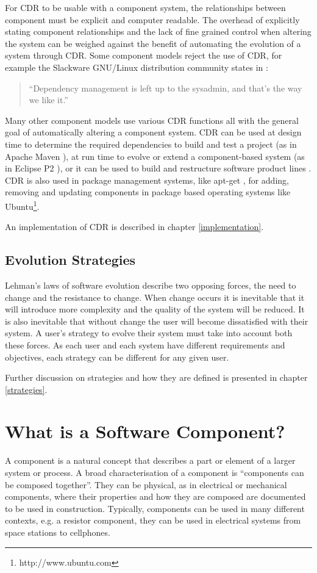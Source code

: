 For CDR to be usable with a component system, the relationships between component must be explicit and computer readable.
The overhead of explicitly stating component relationships and the lack of fine grained control when altering the system
can be weighed against the benefit of automating the evolution of a system through CDR.
Some component models reject the use of CDR, 
for example the Slackware GNU/Linux distribution community states in \citep{Lumens2000}:
\begin{quote}
``Dependency management is left up to the sysadmin, and that's the way we like it.''
\end{quote}
Many other component models use various CDR functions all with the general goal of automatically altering a component system.
CDR can be used at design time to determine the required dependencies to build and test a project (as in Apache Maven \citep{casey_better_2008}),
at run time to evolve or extend a component-based system (as in Eclipse P2 \citep{leBerre2010}),
or it can be used to build and restructure software product lines \citep{savolainen_analyzing_2007}.
CDR is also used in package management systems, like apt-get \citep{Barth2005},
for adding, removing and updating components in package based operating systems like Ubuntu\footnote{http://www.ubuntu.com}. 

An implementation of CDR is described in chapter \ref{implementation}.

\subsection{Evolution Strategies}
Lehman's laws of software evolution \citep{lehman1980,lehman1997} describe two opposing forces,
the need to change and the resistance to change.
When change occurs it is inevitable that it will introduce more complexity and the quality of the system will be reduced.
It is also inevitable that without change the user will become dissatisfied with their system.
A user's strategy to evolve their system must take into account both these forces.
As each user and each system have different requirements and objectives, each strategy can be different for any given user.

Further discussion on strategies and how they are defined is presented in chapter \ref{strategies}.

\section{What is a Software Component?}
\label{background.components}
A component is a natural concept that describes a part or element of a larger system or process.
A broad characterisation of a component is ``components can be composed together''.
They can be physical, as in electrical or mechanical components, where their properties and how they are composed are documented to be used in construction.
Typically, components can be used in many different contexts, e.g. a resistor component, they can be used in electrical systems from space stations to cellphones.   

